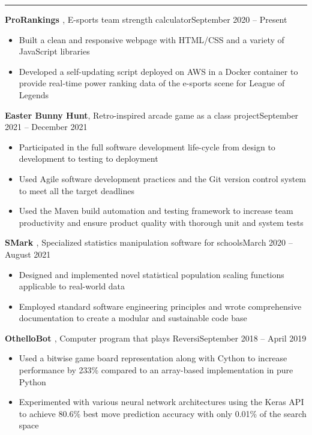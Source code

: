 \documentclass{article}
\newcommand{\entrytitle}[3]{\vspace{0.5em}\textbf{#1}, {\small #2}\hfill #3}
\renewcommand{\section}[1]{\vspace{1em}{\Large #1}\vspace{0.3em}\hrule}
\newenvironment{entrybody}{\begin{itemize}[itemsep=0.3em]}{\end{itemize}}
\begin{document}
\section{Projects}

\entrytitle{ProRankings \href{https://github.com/xtevenx/ProRankings}{\faGithub}} %
    {E-sports team strength calculator}{September 2020 – Present}
\begin{entrybody}
\item Built a clean and responsive webpage with HTML/CSS and a variety of JavaScript libraries
\item
    Developed a self-updating script deployed on AWS in a Docker container to provide real-time
    power ranking data of the e-sports scene for League of Legends
\end{entrybody}

\entrytitle{Easter Bunny Hunt} %
    {Retro-inspired arcade game as a class project}{September 2021 – December 2021}
\begin{entrybody}
\item
    Participated in the full software development life-cycle from design to development to
    testing to deployment
\item
    Used Agile software development practices and the Git version control system to meet all the
    target deadlines
\item
    Used the Maven build automation and testing framework to increase team productivity and
    ensure product quality with thorough unit and system tests
\end{entrybody}

\entrytitle{SMark \href{https://github.com/xtevenx/SMark}{\faGithub}} %
    {Specialized statistics manipulation software for schools}{March 2020 – August 2021}
\begin{entrybody}
\item
    Designed and implemented novel statistical population scaling functions applicable to
    real-world data
\item
    Employed standard software engineering principles and wrote comprehensive documentation to
    create a modular and sustainable code base
\end{entrybody}

\entrytitle{OthelloBot \href{https://github.com/xtevenx/othello-bot}{\faGithub}} %
    {Computer program that plays Reversi}{September 2018 – April 2019}
\begin{entrybody}
\item  %
    Used a bitwise game board representation along with Cython to increase performance by 233\%
    compared to an array-based implementation in pure Python
\item  %
    Experimented with various neural network architectures using the Keras API to achieve 80.6\%
    best move prediction accuracy with only 0.01\% of the search space
\end{entrybody}
\end{document}
